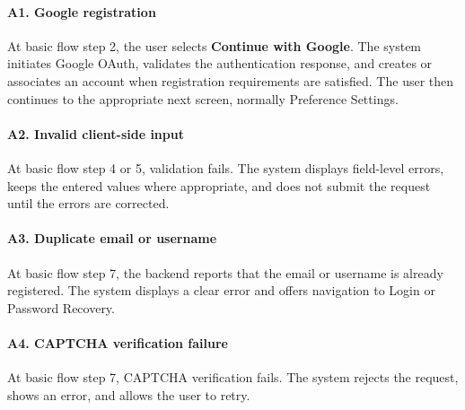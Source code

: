 \documentclass[12pt]{article}
\begin{document}
\hypertarget{sec:a1-google-registration}{}
\paragraph*{A1. Google registration}
\par\medskip

At basic flow step 2, the user selects \textbf{Continue with Google}. The system initiates Google OAuth, validates the authentication response, and creates or associates an account when registration requirements are satisfied. The user then continues to the appropriate next screen, normally Preference Settings.
\par\medskip

\hypertarget{sec:a2-invalid-client-side-input}{}
\paragraph*{A2. Invalid client-side input}
\par\medskip

At basic flow step 4 or 5, validation fails. The system displays field-level errors, keeps the entered values where appropriate, and does not submit the request until the errors are corrected.
\par\medskip

\hypertarget{sec:a3-duplicate-email-or-username}{}
\paragraph*{A3. Duplicate email or username}
\par\medskip

At basic flow step 7, the backend reports that the email or username is already registered. The system displays a clear error and offers navigation to Login or Password Recovery.
\par\medskip

\hypertarget{sec:a4-captcha-verification-failure}{}
\paragraph*{A4. CAPTCHA verification failure}
\par\medskip

At basic flow step 7, CAPTCHA verification fails. The system rejects the request, shows an error, and allows the user to retry.
\par\medskip

\hypertarget{sec:a5-resend-otp}{}
\end{document}

